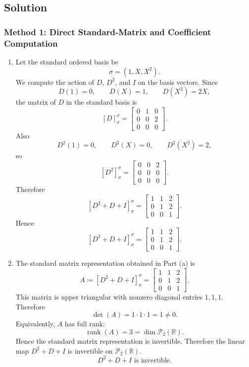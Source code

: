 \documentclass[12pt]{article}
\newcommand{\R}{\mathbb{R}}
\newcommand{\cP}{\mathcal{P}}
\newcommand{\df}{\coloneqq}
\newcommand{\rank}{\operatorname{rank}}
\begin{document}
\newpage
\subsection{Solution}

\subsubsection{Method 1: Direct Standard-Matrix and Coefficient Computation}
\begin{enumerate}[label=(\alph*)]
  \item Let the standard ordered basis be
  \[
    \sigma=(1,X,X^2).
  \]
  We compute the action of $D$, $D^2$, and $I$ on the basis vectors.
  Since
  \[
    D(1)=0,\qquad D(X)=1,\qquad D(X^2)=2X,
  \]
  the matrix of $D$ in the standard basis is
  \[
    [D]_{\sigma}^{\sigma}
    =
    \begin{bmatrix}
      0&1&0\\
      0&0&2\\
      0&0&0
    \end{bmatrix}.
  \]
  Also
  \[
    D^2(1)=0,
    \qquad
    D^2(X)=0,
    \qquad
    D^2(X^2)=2,
  \]
  so
  \[
    [D^2]_{\sigma}^{\sigma}
    =
    \begin{bmatrix}
      0&0&2\\
      0&0&0\\
      0&0&0
    \end{bmatrix}.
  \]
  Therefore
  \[
    [D^2+D+I]_{\sigma}^{\sigma}
    =
    \begin{bmatrix}
      1&1&2\\
      0&1&2\\
      0&0&1
    \end{bmatrix}.
  \]
  Hence
  \[
    \boxed{[D^2+D+I]_{\sigma}^{\sigma}
    =
    \begin{bmatrix}
      1&1&2\\
      0&1&2\\
      0&0&1
    \end{bmatrix}.}
  \]

  \item The standard matrix representation obtained in Part (a) is
  \[
    A\df [D^2+D+I]_{\sigma}^{\sigma}
    =
    \begin{bmatrix}
      1&1&2\\
      0&1&2\\
      0&0&1
    \end{bmatrix}.
  \]
  This matrix is upper triangular with nonzero diagonal entries $1,1,1$. Therefore
  \[
    \det(A)=1\cdot 1\cdot 1=1\ne 0.
  \]
  Equivalently, $A$ has full rank:
  \[
    \rank(A)=3=\dim\cP_2(\R).
  \]
  Hence the standard matrix representation is invertible. Therefore the linear map $D^2+D+I$ is invertible on $\cP_2(\R)$.
  \[
    \boxed{D^2+D+I\text{ is invertible}.}
  \]


\end{enumerate}
\end{document}
